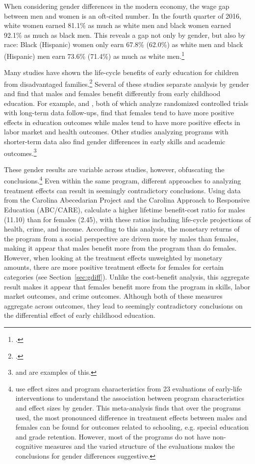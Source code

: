 When considering gender differences in the modern economy, the wage gap between men and women is an oft-cited number. In the fourth quarter of 2016, white women earned 81.1\% as much as white men and black women earned 92.1\% as much as black men. This reveals a gap not only by gender, but also by race: Black (Hispanic) women only earn 67.8\% (62.0\%) as white men and black (Hispanic) men earn 73.6\% (71.4\%) as much as white men.\footnote{\citet{USDPTL_2017_Wage_News-Release}.} 

Many studies have shown the life-cycle benefits of early education for children from disadvantaged families.\footnote{\citet{Elango_Hojman_etal_2016_Early-Edu}.} Several of these studies separate analysis by gender and find that males and females benefit differently from early childhood education. For example, \citet{Heckman_Moon_etal_2010_QE} and \citet{Garcia_etal_2016_Comp_CBA_Unpublished}, both of which analyze randomized controlled trials with long-term data follow-ups, find that females tend to have more positive effects in education outcomes while males tend to have more positive effects in labor market and health outcomes. Other studies analyzing programs with shorter-term data also find gender differences in early skills and academic outcomes.\footnote{\citet{Deming_2009_AEJAE} and \citet{Ou_Reynolds_2010_Mechanisms_CYSR} are examples of this.} 

These gender results are variable across studies, however, obfuscating the conclusions.\footnote{\citet{Magnuson_Kelchen_Duncan_etal_2016_ECRQ} use effect sizes and program characteristics from 23 evaluations of early-life interventions to understand the association between program characteristics and effect sizes by gender. This meta-analysis finds that over the programs used, the most pronounced difference in treatment effects between males and females can be found for outcomes related to schooling, e.g. special education and grade retention. However, most of the programs do not have non-cognitive measures and the varied structure of the evaluations makes the conclusions for gender differences suggestive.} Even within the same program, different approaches to analyzing treatment effects can result in seemingly contradictory conclusions. Using data from the Carolina Abecedarian Project and the Carolina Approach to Responsive Education (ABC/CARE), \citet{Garcia_etal_2016_Comp_CBA_Unpublished} calculate a higher lifetime benefit-cost ratio for males (11.10) than for females (2.45), with these ratios including life-cycle projections of health, crime, and income. According to this analysis, the monetary returns of the program from a social perspective are driven more by males than females, making it appear that males benefit more from the program than do females. However, when looking at the treatment effects unweighted by monetary amounts, there are more positive treatment effects for females for certain categories (see Section~\ref{sec:gdiff}). Unlike the cost-benefit analysis, this aggregate result makes it appear that females benefit more from the program in skills, labor market outcomes, and crime outcomes. Although both of these measures aggregate across outcomes, they lead to seemingly contradictory conclusions on the differential effect of early childhood education.

